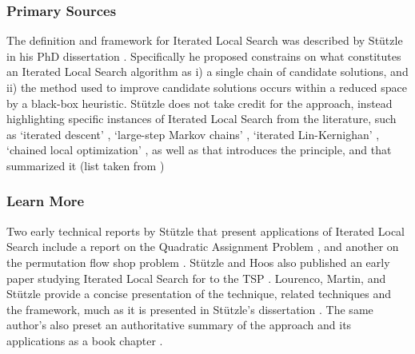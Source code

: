 \subsubsection{Primary Sources}
The definition and framework for Iterated Local Search was described by St\"utzle in his PhD dissertation \cite{Stutzle1998}. Specifically he proposed constrains on what constitutes an Iterated Local Search algorithm as i) a single chain of candidate solutions, and ii) the method used to improve candidate solutions occurs within a reduced space by a black-box heuristic.
St\"utzle does not take credit for the approach, instead highlighting specific instances of Iterated Local Search from the literature, such as `iterated descent' \cite{Baum1986}, `large-step Markov chains' \cite{Martin1991}, `iterated Lin-Kernighan' \cite{Johnson1990}, `chained local optimization' \cite{Martin1996}, as well as \cite{Baxter1981} that introduces the principle, and \cite{Johnson1997} that summarized it (list taken from \cite{Ramalhinho-Lourenco2003})

% 
% 
\subsubsection{Learn More}
Two early technical reports by St\"utzle that present applications of Iterated Local Search include a report on the Quadratic Assignment Problem \cite{Stuetzle1999}, and another on the permutation flow shop problem \cite{Stutzle1998a}. St\"utzle and Hoos also published an early paper studying Iterated Local Search for to the TSP \cite{Stutzle1999}.
Lourenco, Martin, and St\"utzle provide a concise presentation of the technique, related techniques and the framework, much as it is presented in St\"utzle's dissertation \cite{Lourenco2001}.
The same author's also preset an authoritative summary of the approach and its applications as a book chapter \cite{Ramalhinho-Lourenco2003}.


